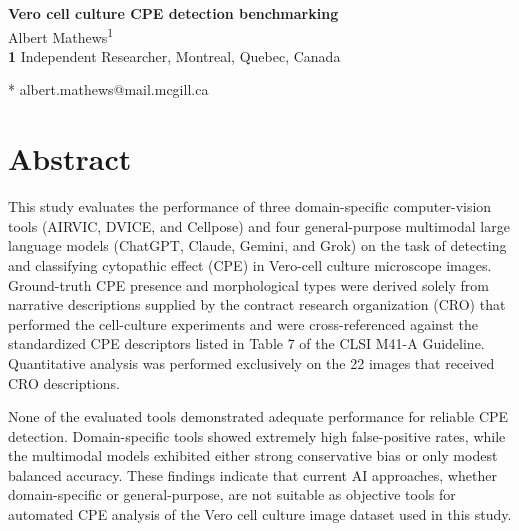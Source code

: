 \documentclass[10pt,letterpaper]{article}
\begin{document}
\vspace*{0.2in}

\begin{flushleft}
{\Large
\textbf{Vero cell culture CPE detection benchmarking} %
}
\newline
\\
Albert Mathews\textsuperscript{1}
\\
\bigskip
\textbf{1} Independent Researcher, Montreal, Quebec, Canada
\\
\bigskip

* albert.mathews@mail.mcgill.ca

\end{flushleft}
\section*{Abstract}
This study evaluates the performance of three domain-specific computer-vision tools (AIRVIC, DVICE, and Cellpose) and four general-purpose multimodal large language models (ChatGPT, Claude, Gemini, and Grok) on the task of detecting and classifying cytopathic effect (CPE) in Vero-cell culture microscope images. Ground-truth CPE presence and morphological types were derived solely from narrative descriptions supplied by the contract research organization (CRO) that performed the cell-culture experiments and were cross-referenced against the standardized CPE descriptors listed in Table 7 of the CLSI M41-A Guideline. Quantitative analysis was performed exclusively on the 22 images that received CRO descriptions.

None of the evaluated tools demonstrated adequate performance for reliable CPE detection. Domain-specific tools showed extremely high false-positive rates, while the multimodal models exhibited either strong conservative bias or only modest balanced accuracy. These findings indicate that current AI approaches, whether domain-specific or general-purpose, are not suitable as objective tools for automated CPE analysis of the Vero cell culture image dataset used in this study.
\end{document}
